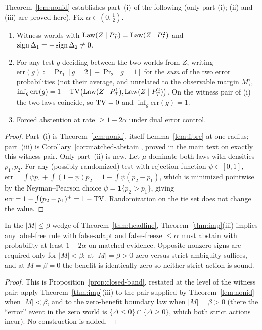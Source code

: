 \begin{theorem}\label{thm:imp}
Theorem~\ref{lem:nonid} establishes part~(i) of the following (only part (i); (ii) and (iii) are
proved here). Fix $\alpha\in(0,\tfrac12)$.
\begin{enumerate}
\item[\textnormal{(i)}] Witness worlds with $\mathrm{Law}(Z\mid P_T^1)=\mathrm{Law}(Z\mid P_T^2)$ and
$\operatorname{sign}\Delta_1=-\operatorname{sign}\Delta_2\neq0$.
\item[\textnormal{(ii)}] For any test $g$ deciding between the two worlds from $Z$, writing
$\mathrm{err}(g):=\Pr_{1}[g{=}2]+\Pr_{2}[g{=}1]$ for the \emph{sum} of the two error
probabilities (not their average, and unrelated to the observable margin $M$),
$\inf_g\mathrm{err}(g)=1-\mathrm{TV}\bigl(\mathrm{Law}(Z\mid P_T^1),\mathrm{Law}(Z\mid P_T^2)\bigr)$. On the witness pair of
(i) the two laws coincide, so $\mathrm{TV}=0$ and $\inf_g\mathrm{err}(g)=1$.
\item[\textnormal{(iii)}] Forced abstention at rate $\ge 1-2\alpha$ under dual error control.
\end{enumerate}
\end{theorem}
\begin{proof}
Part~(i) is Theorem~\ref{lem:nonid}, itself Lemma~\ref{lem:fibre} at one radius; part~(iii) is
Corollary~\ref{cor:matched-abstain}, proved in the main text on exactly this witness pair. Only
part~(ii) is new. Let $\mu$ dominate both laws with densities $p_1,p_2$. For any (possibly
randomized) test with rejection function $\psi\in[0,1]$,
$\mathrm{err}=\int\psi p_1+\int(1-\psi)p_2 = 1-\int\psi(p_2-p_1)$, which is minimized pointwise by
the Neyman--Pearson choice $\psi=\mathbf 1\{p_2>p_1\}$, giving
$\mathrm{err}=1-\int(p_2-p_1)^+=1-\mathrm{TV}$. Randomization on the tie set does not change the value.
\end{proof}

\begin{corollary}\label{cor:forced-abstain}
In the $|M|\le\beta$ wedge of Theorem~\ref{thm:headline}, Theorem~\ref{thm:imp}(iii) implies
any label-free rule with false-adapt and false-freeze $\le\alpha$ must abstain with probability at
least $1-2\alpha$ on matched evidence. Opposite nonzero signs are required only for $|M|<\beta$;
at $|M|=\beta>0$ zero-versus-strict ambiguity suffices, and at $M=\beta=0$ the benefit is
identically zero so neither strict action is sound.
\end{corollary}
\begin{proof}
This is Proposition~\ref{prop:closed-band}, restated at the level of the witness pair: apply
Theorem~\ref{thm:imp}(iii) to the pair supplied by Theorem~\ref{lem:nonid} when $|M|<\beta$, and to
the zero-benefit boundary law when $|M|=\beta>0$ (there the ``error'' event in the zero world is
$\{\Delta\le0\}\cap\{\Delta\ge0\}$, which both strict actions incur). No construction is added.
\end{proof}

